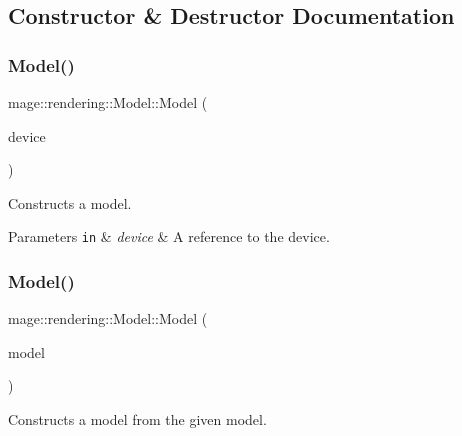 \subsection{Constructor \& Destructor Documentation}
\hypertarget{classmage_1_1rendering_1_1_model_a7f135a6ed7604655e94d3264bd9d5c62}{}\label{classmage_1_1rendering_1_1_model_a7f135a6ed7604655e94d3264bd9d5c62} 
\subsubsection{\texorpdfstring{Model()}{Model()}\hspace{0.1cm}{\footnotesize\ttfamily [1/3]}}
{\footnotesize\ttfamily mage\+::rendering\+::\+Model\+::\+Model (\begin{DoxyParamCaption}\item[{I\+D3\+D11\+Device \&}]{device }\end{DoxyParamCaption})\hspace{0.3cm}{\ttfamily [explicit]}}

Constructs a model.


\begin{DoxyParams}[1]{Parameters}
\mbox{\tt in}  & {\em device} & A reference to the device. \\
\hline
\end{DoxyParams}
\hypertarget{classmage_1_1rendering_1_1_model_a59a64dc710efaa44b9f256883d0ab9cb}{}\label{classmage_1_1rendering_1_1_model_a59a64dc710efaa44b9f256883d0ab9cb} 
\subsubsection{\texorpdfstring{Model()}{Model()}\hspace{0.1cm}{\footnotesize\ttfamily [2/3]}}
{\footnotesize\ttfamily mage\+::rendering\+::\+Model\+::\+Model (\begin{DoxyParamCaption}\item[{const \hyperlink{classmage_1_1rendering_1_1_model}{Model} \&}]{model }\end{DoxyParamCaption})\hspace{0.3cm}{\ttfamily [delete]}}

Constructs a model from the given model.



